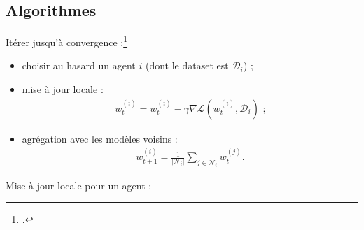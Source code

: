 \documentclass[notheorems]{beamer}
\begin{document}
\subsection{Algorithmes}
\begin{frame}
  Itérer jusqu'à convergence :\footcite{lian2017decentralized}
  \begin{itemize}
  \item choisir au hasard un agent $i$ (dont le dataset est $\mathcal D_i$) ;
  \item mise à jour locale :
    \begin{align}
      w_{t}^{(i)} = w_{t}^{(i)} - \gamma \nabla \mathcal L(w_{t}^{(i)}, \mathcal{D}_i)\text{ ;}
    \end{align}
  \item agrégation avec les modèles voisins :
    \begin{align}
      w_{t+1}^{(i)} = \frac{1}{|\mathcal N_i|} \sum_{j\in\mathcal N_i} w_t^{(j)}.
    \end{align}
  \end{itemize}
\end{frame}


\begin{frame}
  Mise à jour locale pour un agent :
  \vspace{1em}
  \begin{figure}
  \end{figure}
\end{frame}
\end{document}
